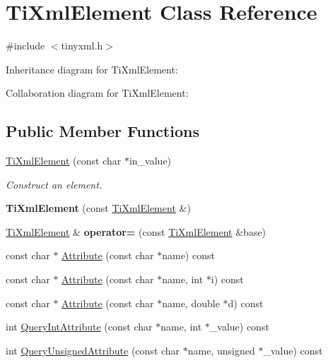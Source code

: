 \hypertarget{class_ti_xml_element}{
\section{\-Ti\-Xml\-Element \-Class \-Reference}
\label{class_ti_xml_element}
}


{\ttfamily \#include $<$tinyxml.\-h$>$}



\-Inheritance diagram for \-Ti\-Xml\-Element\-:


\-Collaboration diagram for \-Ti\-Xml\-Element\-:
\subsection*{\-Public \-Member \-Functions}
\begin{DoxyCompactItemize}
\item 
\hypertarget{class_ti_xml_element_a01bc3ab372d35da08efcbbe65ad90c60}{
\hyperlink{class_ti_xml_element_a01bc3ab372d35da08efcbbe65ad90c60}{\-Ti\-Xml\-Element} (const char $\ast$in\-\_\-value)}
\label{class_ti_xml_element_a01bc3ab372d35da08efcbbe65ad90c60}

\begin{DoxyCompactList}\small\item\em \-Construct an element. \end{DoxyCompactList}\item 
\hypertarget{class_ti_xml_element_a1ca4465f3c2eac6a60e641cd7f1d9f7e}{
{\bfseries \-Ti\-Xml\-Element} (const \hyperlink{class_ti_xml_element}{\-Ti\-Xml\-Element} \&)}
\label{class_ti_xml_element_a1ca4465f3c2eac6a60e641cd7f1d9f7e}

\item 
\hypertarget{class_ti_xml_element_ad58d300f4cfc0016ffa6861ebb718a0b}{
\hyperlink{class_ti_xml_element}{\-Ti\-Xml\-Element} \& {\bfseries operator=} (const \hyperlink{class_ti_xml_element}{\-Ti\-Xml\-Element} \&base)}
\label{class_ti_xml_element_ad58d300f4cfc0016ffa6861ebb718a0b}

\item 
const char $\ast$ \hyperlink{class_ti_xml_element_ac1e4691e9375ba4e665dce7e46a50a9c}{\-Attribute} (const char $\ast$name) const 
\item 
const char $\ast$ \hyperlink{class_ti_xml_element_aa9192e80567b5042dbded80b78c44339}{\-Attribute} (const char $\ast$name, int $\ast$i) const 
\item 
const char $\ast$ \hyperlink{class_ti_xml_element_aec4f727f8aa49b51248d80125d173136}{\-Attribute} (const char $\ast$name, double $\ast$d) const 
\item 
int \hyperlink{class_ti_xml_element_aea0bfe471380f281c5945770ddbf52b9}{\-Query\-Int\-Attribute} (const char $\ast$name, int $\ast$\-\_\-value) const 
\item 
\hypertarget{class_ti_xml_element_ae48df644f890ab86fa19839ac401f00d}{
int \hyperlink{class_ti_xml_element_ae48df644f890ab86fa19839ac401f00d}{\-Query\-Unsigned\-Attribute} (const char $\ast$name, unsigned $\ast$\-\_\-value) const }
\label{class_ti_xml_element_ae48df644f890ab86fa19839ac401f00d}


\end{DoxyCompactItemize}
